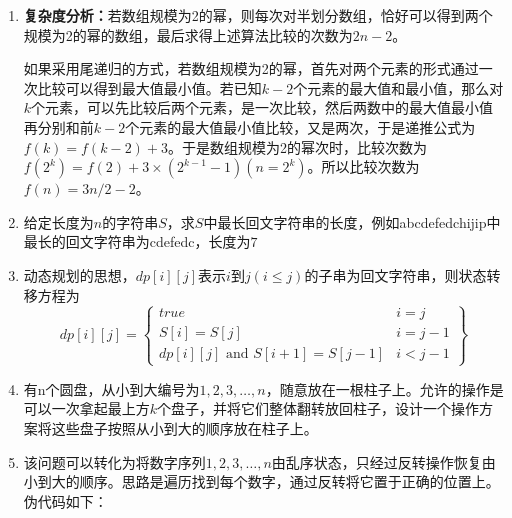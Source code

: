 \documentclass[12pt,a4paper]{article}
\makeatletter
\newtheorem*{solution}{Solution}
\theoremstyle{definition}
\renewenvironment{solution}[1][Solution] {\par\pushQED{\qed}\normalfont\topsep6\p@\@plus6\p@\relax\trivlist\item[\hskip\labelsep\bfseries#1\@addpunct{.}]\ignorespaces}{\popQED\endtrivlist\@endpefalse} \makeatother
\makeatother
\begin{document}
\begin{enumerate}
\begin{solution}
	\textbf{复杂度分析：}若数组规模为2的幂，则每次对半划分数组，恰好可以得到两个规模为2的幂的数组，最后求得上述算法比较的次数为$2n-2$。
	
	如果采用尾递归的方式，若数组规模为2的幂，首先对两个元素的形式通过一次比较可以得到最大值最小值。若已知$k-2$个元素的最大值和最小值，那么对$k$个元素，可以先比较后两个元素，是一次比较，然后两数中的最大值最小值再分别和前$k-2$个元素的最大值最小值比较，又是两次，于是递推公式为$f(k)=f(k-2)+3$。于是数组规模为2的幂次时，比较次数为$f(2^k)=f(2)+3\times(2^{k-1}-1) (n=2^k)$。所以比较次数为$f(n)=3n/2-2$。
\end{solution}

\item 给定长度为$n$的字符串$S$，求$S$中最长回文字符串的长度，例如abcdefedchijip中最长的回文字符串为cdefedc，长度为$7$

\begin{solution}
	动态规划的思想，$dp[i][j]$表示$i$到$j(i\leq j)$的子串为回文字符串，则状态转移方程为$$dp[i][j]=\left\{
	\begin{array}{ll}
	true&{i=j}\\
	S[i]=S[j]&{i=j-1}\\
	dp[i][j]\text{ and }S[i+1]=S[j-1]&{i<j-1}
	\end{array}
	\right\}$$
	\begin{algorithm}[H]
		\SetAlgoLined
		\caption{$palindromic()$}
	\end{algorithm}
\end{solution}

\item 有n个圆盘，从小到大编号为$1,2,3,\ldots,n$，随意放在一根柱子上。允许的操作是可以一次拿起最上方$k$个盘子，并将它们整体翻转放回柱子，设计一个操作方案将这些盘子按照从小到大的顺序放在柱子上。

\begin{solution}
	该问题可以转化为将数字序列$1,2,3,\ldots,n$由乱序状态，只经过反转操作恢复由小到大的顺序。思路是遍历找到每个数字，通过反转将它置于正确的位置上。伪代码如下：
	\begin{algorithm}[H]
		\SetAlgoLined
		\caption{$invert(end)$}
	\end{algorithm}
	\begin{algorithm}[H]
		\SetAlgoLined
		\caption{$solve()$}
	\end{algorithm}
\end{solution}


\end{enumerate}
\end{document}
